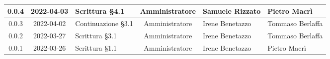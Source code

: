 \begin{center}
\begin{longtable}{ |c|c|p{8em}|c|m{5em}|m{6em}| }
	\hline
	0.0.4 & 2022-04-03 & Scrittura §4.1 & Amministratore & Samuele \newline Rizzato & Pietro \newline Macrì\\
	\hline
	0.0.3 & 2022-04-02 & Continuazione §3.1 & Amministratore & Irene \newline Benetazzo & Tommaso \newline Berlaffa \\
	\hline
	0.0.2 & 2022-03-27 & Scrittura §3.1 & Amministratore & Irene \newline Benetazzo & Tommaso \newline Berlaffa \\
	\hline
	0.0.1 & 2022-03-26 & Scrittura §1.1 & Amministratore & Irene \newline Benetazzo & Pietro \newline Macrì \\
	\hline
	\end{longtable}
	\end{center}
	\newpage